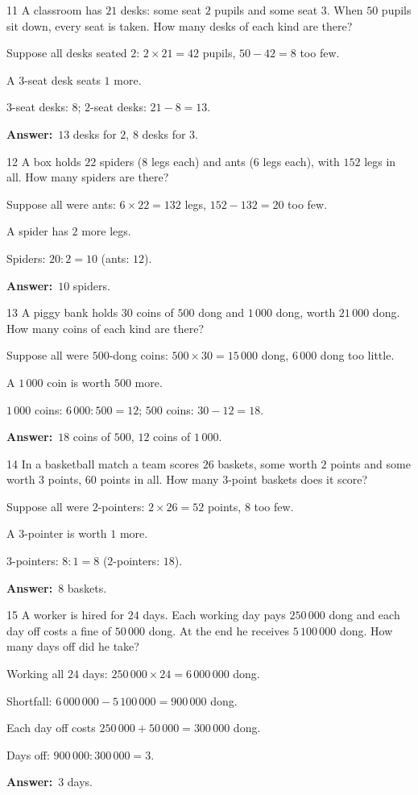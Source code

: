 \documentclass[11pt]{article}
\newif\ifsol \solfalse
\providecommand{\AnsWord}{Đáp số}
\newcommand{\dapso}[1]{\par\textbf{\AnsWord:}\ #1}
\newcommand{\probsol}[1]{%
  \begin{lrbox}{\solmeasure}\begin{minipage}{\dimexpr\linewidth-24pt\relax}#1\end{minipage}\end{lrbox}%
  \ifsol
    \begin{solbox}#1\end{solbox}%
  \else
    \setlength{\solht}{\dimexpr\ht\solmeasure+\dp\solmeasure+0.85cm\relax}%
    \ifdim\solht<1.35cm\setlength{\solht}{1.35cm}\fi
    \begin{tcolorbox}[colback=white,colframe=Line,boxrule=0.8pt,arc=5pt,
      left=8pt,right=8pt,top=4pt,bottom=4pt,height=\solht]{\footnotesize\color{Slate}\itshape\WorkWord}\end{tcolorbox}%
  \fi}
\newcommand{\gap}{\vspace{0.3cm}}
\def\WorkWord{Your work:}
\def\AnsWord{Answer}
\begin{document}
\gap
\begin{probbox}{11}{\relax}
A classroom has $21$ desks: some seat $2$ pupils and some seat $3$. When $50$ pupils sit down, every seat is taken. How many desks of each kind are there?
\end{probbox}
\probsol{
Suppose all desks seated $2$: $2\times21=42$ pupils, $50-42=8$ too few.\par
A $3$-seat desk seats $1$ more.\par $3$-seat desks: $8$; $2$-seat desks: $21-8=13$.
\dapso{$13$ desks for $2$, $8$ desks for $3$.}}
\gap
\begin{probbox}{12}{\relax}
A box holds $22$ spiders ($8$ legs each) and ants ($6$ legs each), with $152$ legs in all. How many spiders are there?
\end{probbox}
\probsol{
Suppose all were ants: $6\times22=132$ legs, $152-132=20$ too few.\par
A spider has $2$ more legs.\par Spiders: $20:2=10$ (ants: $12$).
\dapso{$10$ spiders.}}
\gap
\begin{probbox}{13}{\relax}
A piggy bank holds $30$ coins of $500$ dong and $1\,000$ dong, worth $21\,000$ dong. How many coins of each kind are there?
\end{probbox}
\probsol{
Suppose all were $500$-dong coins: $500\times30=15\,000$ dong, $6\,000$ dong too little.\par
A $1\,000$ coin is worth $500$ more.\par $1\,000$ coins: $6\,000:500=12$; $500$ coins: $30-12=18$.
\dapso{$18$ coins of $500$, $12$ coins of $1\,000$.}}
\gap
\begin{probbox}{14}{\relax}
In a basketball match a team scores $26$ baskets, some worth $2$ points and some worth $3$ points, $60$ points in all. How many $3$-point baskets does it score?
\end{probbox}
\probsol{
Suppose all were $2$-pointers: $2\times26=52$ points, $8$ too few.\par
A $3$-pointer is worth $1$ more.\par $3$-pointers: $8:1=8$ ($2$-pointers: $18$).
\dapso{$8$ baskets.}}
\gap
\begin{probbox}{15}{\relax}
A worker is hired for $24$ days. Each working day pays $250\,000$ dong and each day off costs a fine of $50\,000$ dong. At the end he receives $5\,100\,000$ dong. How many days off did he take?
\end{probbox}
\probsol{
Working all $24$ days: $250\,000\times24=6\,000\,000$ dong.\par
Shortfall: $6\,000\,000-5\,100\,000=900\,000$ dong.\par
Each day off costs $250\,000+50\,000=300\,000$ dong.\par Days off: $900\,000:300\,000=3$.
\dapso{$3$ days.}}
\end{document}
